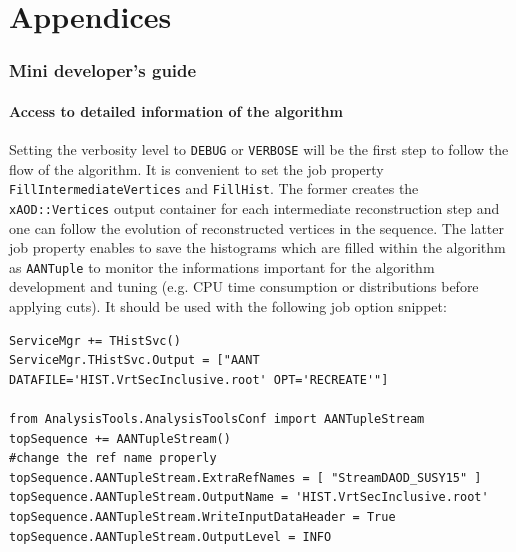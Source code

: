 \documentclass[NOTE, atlasdraft=true, texlive=2018, UKenglish]{\ATLASLATEXPATH atlasdoc}
\begin{document}
\appendix
\part*{Appendices}

\section{Mini developer's guide}

\subsection{Access to detailed information of the algorithm}
Setting the verbosity level to {\tt DEBUG} or {\tt VERBOSE} will be the first step to follow the flow of the algorithm. It is convenient to set the job property {\tt FillIntermediateVertices} and {\tt FillHist}. The former creates the {\tt xAOD::Vertices} output container for each intermediate reconstruction step and one can follow the evolution of reconstructed vertices in the sequence. The latter job property enables to save the histograms which are filled within the algorithm as {\tt AANTuple} to monitor the informations important for the algorithm development and tuning (e.g. CPU time consumption or distributions before applying cuts). It should be used with the following job option snippet:

\begin{scriptsize}
\begin{verbatim}
ServiceMgr += THistSvc()
ServiceMgr.THistSvc.Output = ["AANT DATAFILE='HIST.VrtSecInclusive.root' OPT='RECREATE'"]

from AnalysisTools.AnalysisToolsConf import AANTupleStream
topSequence += AANTupleStream()
#change the ref name properly
topSequence.AANTupleStream.ExtraRefNames = [ "StreamDAOD_SUSY15" ]
topSequence.AANTupleStream.OutputName = 'HIST.VrtSecInclusive.root'
topSequence.AANTupleStream.WriteInputDataHeader = True
topSequence.AANTupleStream.OutputLevel = INFO
\end{verbatim}
\end{scriptsize}
\end{document}

